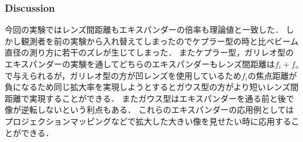 \documentclass[11pt, a4paper]{jsarticle}
\begin{document}
\subsubsection{Discussion}
今回の実験ではレンズ間距離もエキスパンダーの倍率も理論値と一致した．
しかし観測者を前の実験から入れ替えてしまったのでケプラー型の時と比べビーム直径の測り方に若干のズレが生じてしまった．
またケプラー型，ガリレオ型のエキスパンダーの実験を通してどちらのエキスパンダーもレンズ間距離は$f_i + f_o$で与えられるが，ガリレオ型の方が凹レンズを使用しているため$f_i$の焦点距離が負になるため同じ拡大率を実現しようとするとガウス型の方がより短いレンズ間距離で実現することができる．
またガウス型はエキスパンダーを通る前と後で像が逆転しないという利点もある．
これらのエキスパンダーの応用例としてはプロジェクションマッピングなどで拡大した大きい像を見せたい時に応用することができる．
\newpage
\end{document}

